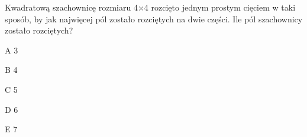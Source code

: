 \begin{tresc}
Kwadratową szachownicę rozmiaru 4×4 rozcięto jednym prostym cięciem w taki sposób, by jak najwięcej pól zostało rozciętych na dwie części. Ile pól szachownicy zostało rozciętych?
\end{tresc}
\begin{wariant}{A} 3 \end{wariant}
\begin{wariant}{B} 4 \end{wariant}
\begin{wariant}{C} 5 \end{wariant}
\begin{wariant}{D} 6 \end{wariant}
\begin{wariant}{E} 7 \end{wariant}
